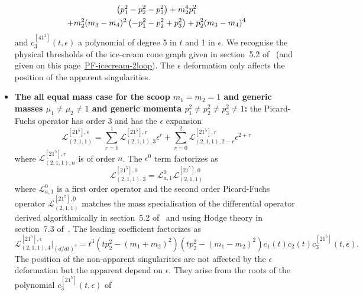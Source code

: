 \documentclass[a4paper,12pt]{article}
\numberwithin{equation}{section}
\numberwithin{figure}{section}
\begin{document}
\begin{itemize}
\begin{multline}
   \left(p_{1}^2-p_{2}^2-p_{3}^2\right)+m_{2}^4 p_{1}^2\cr+m_{2}^2 (m_{3}-m_{4})^2
   \left(-p_{1}^2-p_{2}^2+p_{3}^2\right)+p_{2}^2 (m_{3}-m_{4})^4
 \end{multline}
 and $c^{[41^3]}_3(t,\epsilon)$ a polynomial of  degree 5 in $t$ and 1 in
 $\epsilon$. We recognise the physical thresholds of the ice-cream
 cone graph given in section~5.2 of~\cite{Lairez:2022zkj} (and given
 on this
 page~\href{https://nbviewer.org/github/pierrevanhove/PicardFuchs/blob/main/PF-icecream-2loop.ipynb}{PF-icecream-2loop}). The
 $\epsilon$ deformation only affects the position of the apparent singularities. 
  \item \textbf{The all equal mass case for the scoop
  $m_1=m_2=1$ and generic masses $\mu_1\neq\mu_2\neq1$ and generic
  momenta  $p_1^2\neq p_2^2\neq
  p_3^2\neq 1$:}  the Picard-Fuchs operator has order 3 and has the
  $\epsilon$ expansion
   \begin{equation}
       \mathscr{L}_{(2,1,1)}^{[21^5],\epsilon}=\sum_{r=0}^1
       \mathscr{L}_{(2,1,1),3}^{[21^5],r} \epsilon^r+ \sum_{r=0}^2   \mathscr{L}_{(2,1,1),2-r}^{[21^5],r} \epsilon^{2+r}
     \end{equation}
     where $ \mathscr{L}_{(2,1,1),n}^{[21^5],r}$  is of order $n$. The
     $\epsilon^0$ term factorizes as
     \begin{equation}
           \mathscr{L}_{(2,1,1),3}^{[21^5],0}=\mathscr{L}_{a,1}^0 \mathscr{L}_{(2,1,1)}^{[21^5] ,0      }
         \end{equation}
         where $\mathscr{L}_{a,1}^0$ is a first order operator and the second order
         Picard-Fuchs operator  $\mathscr{L}_{(2,1,1)}^{[21^5] ,0}
         $ matches the mass specialisation of the differential
         operator derived algorithmically in section~5.2
         of~\cite{Lairez:2022zkj} and using Hodge theory in
         section~7.3 of~\cite{Doran:2023yzu}.
           The leading coefficient factorizes as
         \begin{equation}
                     \mathscr{L}_{(2,1,1),4}^{[21^5],\epsilon}\Big|_{(d/dt)^4}=t^3
                     (tp_2^2-(m_1+m_2)^2)(tp_2^2-(m_1-m_2)^2) c_1(t)
                     c_2(t) c^{[21^5]}_3(t,\epsilon)   .
                   \end{equation}
                 The position of the non-apparent singularities are
                 not affected by the $\epsilon$ deformation but the
                 apparent depend on $\epsilon$. They arise from the
                 roots of the polynomial $c^{[21^5]}_3(t,\epsilon)   $ of

\end{itemize}
\end{document}
